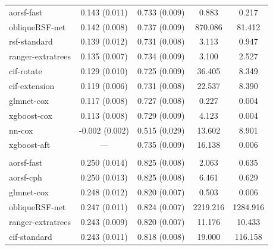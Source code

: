 \documentclass[12pt]{article}\usepackage[]{graphicx}\usepackage[]{xcolor}
\newenvironment{knitrout}{}{} %
\begin{document}
\begin{knitrout}
\begin{longtable}[t]{lcccc}
\hspace{1em}aorsf-fast & 0.143 (0.011) & 0.733 (0.009) & 0.883 & 0.217\\
\hspace{1em}obliqueRSF-net & 0.142 (0.008) & 0.737 (0.009) & 870.086 & 81.412\\
\hspace{1em}rsf-standard & 0.139 (0.012) & 0.731 (0.008) & 3.113 & 0.947\\
\hspace{1em}ranger-extratrees & 0.135 (0.007) & 0.734 (0.009) & 3.100 & 2.527\\
\hspace{1em}cif-rotate & 0.129 (0.010) & 0.725 (0.009) & 36.405 & 8.349\\
\hspace{1em}cif-extension & 0.119 (0.006) & 0.731 (0.008) & 22.537 & 8.390\\
\hspace{1em}glmnet-cox & 0.117 (0.008) & 0.727 (0.008) & 0.227 & 0.004\\
\hspace{1em}xgboost-cox & 0.113 (0.008) & 0.729 (0.009) & 4.123 & 0.004\\
\hspace{1em}nn-cox & -0.002 (0.002) & 0.515 (0.029) & 13.602 & 8.901\\
\hspace{1em}xgboost-aft & --- & 0.735 (0.009) & 16.138 & 0.006\\
\addlinespace[0.3em]
\multicolumn{5}{l}{\textit{\textbf{Serum free light chain; death, n = 7874, p = 10}}}\\
\hline
\hspace{1em}aorsf-fast & 0.250 (0.014) & 0.825 (0.008) & 2.063 & 0.635\\
\hspace{1em}aorsf-cph & 0.250 (0.013) & 0.825 (0.008) & 6.461 & 0.629\\
\hspace{1em}glmnet-cox & 0.248 (0.012) & 0.820 (0.007) & 0.503 & 0.006\\
\hspace{1em}obliqueRSF-net & 0.247 (0.011) & 0.824 (0.007) & 2219.216 & 1284.916\\
\hspace{1em}ranger-extratrees & 0.243 (0.009) & 0.820 (0.007) & 11.176 & 10.433\\
\hspace{1em}cif-standard & 0.243 (0.011) & 0.818 (0.008) & 19.000 & 116.158\\

\end{longtable}
\end{knitrout}
\end{document}
